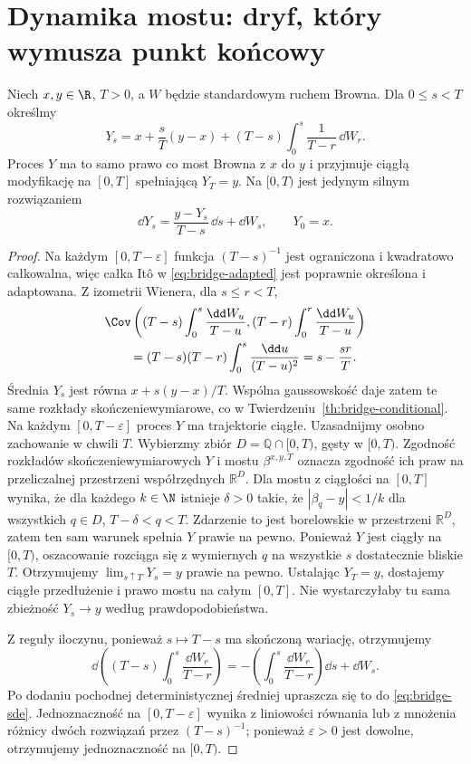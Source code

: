 \section{Dynamika mostu: dryf, który wymusza punkt końcowy}

\begin{twierdzenie}
\label{th:bridge-sde}
Niech $x,y\in\R$, $T>0$, a $W$ będzie standardowym
ruchem Browna. Dla $0\le s<T$ określmy
\[
 Y_s=x+\frac{s}{T}(y-x)+(T-s)\int_0^s\frac1{T-r}\,\dd W_r.
\tag{15.4}\label{eq:bridge-adapted}
\]
Proces $Y$ ma to samo prawo co most Browna z $x$ do $y$
i przyjmuje ciągłą modyfikację na $[0,T]$ spełniającą
$Y_T=y$. Na $[0,T)$ jest jedynym silnym rozwiązaniem
\[
 \dd Y_s=\frac{y-Y_s}{T-s}\,\dd s+\dd W_s,
 \qquad Y_0=x.
\tag{15.5}\label{eq:bridge-sde}
\]
\end{twierdzenie}
\begin{proof}
Na każdym $[0,T-\varepsilon]$ funkcja
$(T-s)^{-1}$ jest ograniczona i kwadratowo całkowalna,
więc całka Itô w \eqref{eq:bridge-adapted} jest
poprawnie określona i adaptowana. Z izometrii Wienera,
dla $s\le r<T$,
\[
\begin{split}
&\Cov\left((T-s)\int_0^s\frac{\dd W_u}{T-u},
 (T-r)\int_0^r\frac{\dd W_u}{T-u}\right)\\
&\qquad=(T-s)(T-r)\int_0^s\frac{\dd u}{(T-u)^2}
 =s-\frac{sr}{T}.
\end{split}
\]
Średnia $Y_s$ jest równa $x+s(y-x)/T$.
Wspólna gaussowskość daje zatem te same rozkłady
skończeniewymiarowe, co w
Twierdzeniu~\ref{th:bridge-conditional}.
Na każdym $[0,T-\varepsilon]$ proces $Y$ ma trajektorie
ciągłe. Uzasadnijmy osobno zachowanie w chwili $T$.
Wybierzmy zbiór $D=\mathbb Q\cap[0,T)$, gęsty w $[0,T)$.
Zgodność rozkładów skończeniewymiarowych $Y$ i mostu
$\beta^{x,y,T}$ oznacza zgodność ich praw na
przeliczalnej przestrzeni współrzędnych $\mathbb R^D$.
Dla mostu z ciągłości na $[0,T]$ wynika, że dla każdego
$k\in\N$ istnieje $\delta>0$ takie, że
$|\beta_q-y|<1/k$ dla wszystkich $q\in D$,
$T-\delta<q<T$. Zdarzenie to jest borelowskie
w przestrzeni $\mathbb R^D$, zatem ten sam warunek
spełnia $Y$ prawie na pewno. Ponieważ $Y$ jest ciągły
na $[0,T)$, oszacowanie rozciąga się z wymiernych $q$
na wszystkie $s$ dostatecznie bliskie $T$. Otrzymujemy
$\lim_{s\uparrow T}Y_s=y$ prawie na pewno. Ustalając
$Y_T=y$, dostajemy ciągłe przedłużenie i prawo mostu
na całym $[0,T]$. Nie wystarczyłaby tu sama zbieżność
$Y_s\to y$ według prawdopodobieństwa.

Z reguły iloczynu, ponieważ $s\mapsto T-s$ ma
skończoną wariację, otrzymujemy
\[
\dd\left((T-s)\int_0^s\frac{\dd W_r}{T-r}\right)
 =-\left(\int_0^s\frac{\dd W_r}{T-r}\right)\dd s+\dd W_s.
\]
Po dodaniu pochodnej deterministycznej średniej
upraszcza się to do \eqref{eq:bridge-sde}.
Jednoznaczność na $[0,T-\varepsilon]$ wynika z
liniowości równania lub z mnożenia różnicy dwóch
rozwiązań przez $(T-s)^{-1}$; ponieważ
$\varepsilon>0$ jest dowolne, otrzymujemy
jednoznaczność na $[0,T)$.
\end{proof}


